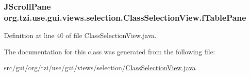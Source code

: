 \hypertarget{classorg_1_1tzi_1_1use_1_1gui_1_1views_1_1selection_1_1_class_selection_view_a0d3fb3fc3c39dc14e7f19d848f877ae8}{
\subsubsection[{f\-Table\-Pane}]{\setlength{\rightskip}{0pt plus 5cm}J\-Scroll\-Pane org.\-tzi.\-use.\-gui.\-views.\-selection.\-Class\-Selection\-View.\-f\-Table\-Pane\hspace{0.3cm}{\ttfamily [protected]}}}\label{classorg_1_1tzi_1_1use_1_1gui_1_1views_1_1selection_1_1_class_selection_view_a0d3fb3fc3c39dc14e7f19d848f877ae8}


Definition at line 40 of file Class\-Selection\-View.\-java.



The documentation for this class was generated from the following file\-:\begin{DoxyCompactItemize}
\item 
src/gui/org/tzi/use/gui/views/selection/\hyperlink{_class_selection_view_8java}{Class\-Selection\-View.\-java}\end{DoxyCompactItemize}
